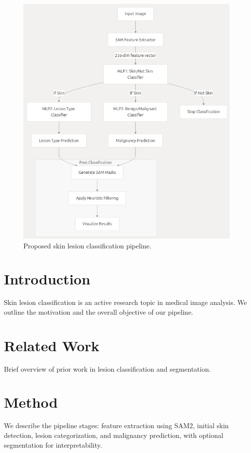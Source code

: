 \begin{figure}[t]
    \centering
    \includegraphics[width=0.85\linewidth]{figures/pipeline.png}
    \caption{Proposed skin lesion classification pipeline.}
\label{fig:pipeline}
\end{figure}

\section{Introduction}

Skin lesion classification is an active research topic in medical image analysis. We outline the motivation and the overall objective of our pipeline.

\section{Related Work}
Brief overview of prior work in lesion classification and segmentation.

\section{Method}
We describe the pipeline stages: feature extraction using SAM2, initial skin detection, lesion categorization, and malignancy prediction, with optional segmentation for interpretability.

